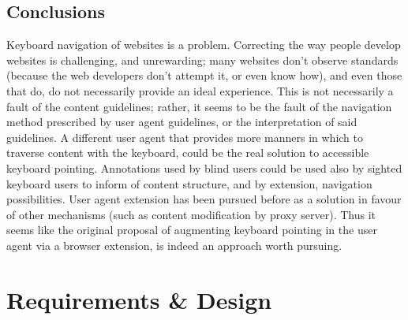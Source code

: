 \documentclass[a4paper, 12pt]{report}
\begin{document}
\section{Conclusions}
Keyboard navigation of websites is a problem. Correcting the way people develop websites is challenging, and unrewarding; many websites don't observe standards (because the web developers don't attempt it, or even know how), and even those that do, do not necessarily provide an ideal experience. This is not necessarily a fault of the content guidelines; rather, it seems to be the fault of the navigation method prescribed by user agent guidelines, or the interpretation of said guidelines. A different user agent that provides more manners in which to traverse content with the keyboard, could be the real solution to accessible keyboard pointing. Annotations used by blind users could be used also by sighted keyboard users to inform of content structure, and by extension, navigation possibilities. User agent extension has been pursued before as a solution in favour of other mechanisms (such as content modification by proxy server). Thus it seems like the original proposal of augmenting keyboard pointing in the user agent via a browser extension, is indeed an approach worth pursuing.

\chapter{Requirements \& Design}
\label{chap:reqanddesign}
\newcommand{\reqinit}{
    \newcounter{reqcountbackup}
    \newcounter{reqcount}
    \renewcommand{\thereqcount}{\textbf{R\arabic{reqcount}}}
}

\newcommand{\reqstart}{
    \begin{list}{\thereqcount}{\usecounter{reqcount}}
    \setcounter{reqcount}{\value{reqcountbackup}}
}

\newcommand{\reqreset}{
    \setcounter{reqcountbackup}{0}
    \setcounter{reqcount}{0}
}
\end{document}
